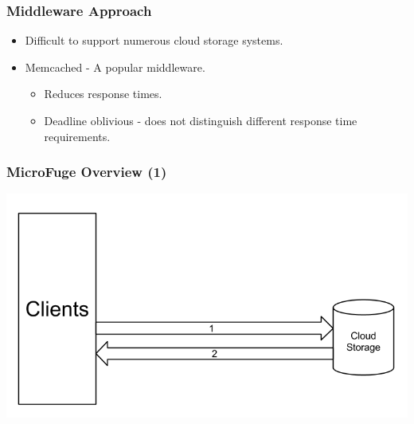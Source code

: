 \documentclass{beamer}
\newcommand{\myv}{\vspace{3 mm}}
\begin{document}
\begin{frame}
  \frametitle{Middleware Approach}
  \begin{itemize}
    \item Difficult to support numerous cloud storage systems.
      \myv
    \item Memcached - A popular middleware.
      \begin{itemize}
        \myv
      \item Reduces response times.
        \myv
      \item Deadline oblivious - does not distinguish different response time
        requirements.
      \end{itemize}
  \end{itemize}
\end{frame}


\begin{frame}
  \frametitle{MicroFuge Overview (1)}
  \begin{center}
    \includegraphics[scale=0.39]{img/MF_FULL_V8_1.png}
  \end{center}
\end{frame}
\end{document}
